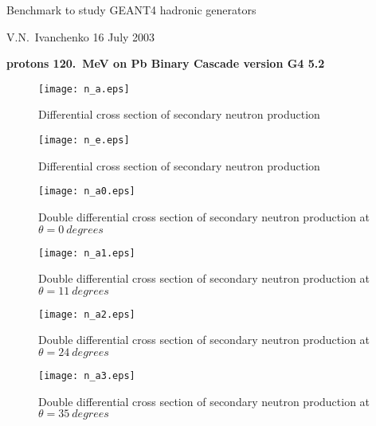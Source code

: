 \documentclass[12pt]{article}
\begin{document}
\pagestyle{empty}

\begin{center}
{\large Benchmark to study GEANT4 hadronic generators}

\vspace*{5mm}
{V.N.~Ivanchenko 16 July 2003}

\vspace*{5mm}


\vspace*{5mm}

{\bf protons 120.~MeV on Pb Binary Cascade version G4 5.2}

\vspace*{1mm}


\end{center}


\begin{figure}[htbp]
\caption{Differential cross section of secondary neutron production}
\label{fig10}
\centerline{\texttt{[image: n\_a.eps]}}
\end{figure}

\begin{figure}[htbp]
\caption{Differential cross section of secondary neutron production}
\label{fig7}
\centerline{\texttt{[image: n\_e.eps]}}
\end{figure}




\clearpage


\begin{figure}[htbp]
\caption{Double differential cross section of secondary neutron production at $\theta = 0~degrees$}
\label{figa0}
\centerline{\texttt{[image: n\_a0.eps]}}
\end{figure}

\begin{figure}[htbp]
\caption{Double differential cross section of secondary neutron production at $\theta = 11~degrees$}
\label{figa1}
\centerline{\texttt{[image: n\_a1.eps]}}
\end{figure}

\begin{figure}[htbp]
\caption{Double differential cross section of secondary neutron production at $\theta = 24~degrees$}
\label{figa2}
\centerline{\texttt{[image: n\_a2.eps]}}
\end{figure}

\clearpage

\begin{figure}[htbp]
\caption{Double differential cross section of secondary neutron production at $\theta = 35~degrees$}
\label{figa3}
\centerline{\texttt{[image: n\_a3.eps]}}
\end{figure}
\end{document}
